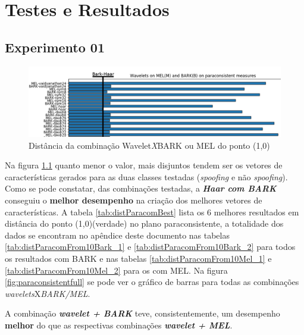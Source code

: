\chapter{Testes e Resultados} \label{chap:testsResults}
	\section{Experimento 01}
	\label{chap:testsResults:sec:Experimento01}
	\begin{figure}[h]
		\centering
		\includegraphics[width=\linewidth]{images/results/paraconsistentPlane/ParaconsistentParcial.png}
		\caption{Distância da combinação Wavelet\textit{X}BARK ou MEL do ponto (1,0)}
		\label{fig:ParaconsistentParcial}
	\end{figure}

	

	\par Na figura \ref{fig:ParaconsistentParcial} quanto menor o valor, mais disjuntos tendem ser os vetores de características gerados para as duas classes testadas (\textit{spoofing }e não \textit{spoofing}). Como se pode constatar, das combinações testadas, a \textit{\textbf{Haar com BARK}} conseguiu o \textbf{melhor desempenho} na criação dos melhores vetores de características. A tabela \ref{tab:distParacomBest} lista os 6 melhores resultados em distância do ponto (1,0)(verdade) no plano paraconsistente, a totalidade dos dados se encontram no apêndice deste documento nas tabelas \ref{tab:distParacomFrom10Bark_1} e \ref{tab:distParacomFrom10Bark_2} para todos os resultados com BARK e nas tabelas \ref{tab:distParacomFrom10Mel_1} e \ref{tab:distParacomFrom10Mel_2} para os com MEL. Na figura \ref{fig:paraconsistentfull} se pode ver o gráfico de barras para todas as combinações \textit{wavelets}X\textit{BARK/MEL}.
	
	\par A combinação \textbf{\textit{wavelet + BARK}} teve, consistentemente, um desempenho \textbf{melhor} do que as respectivas combinações \textbf{\textit{wavelet + MEL}}.
	
